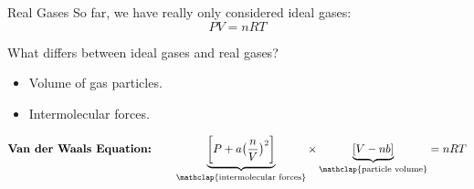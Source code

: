 \documentclass[notes=hide]{beamer}
\begin{document}
\begin{frame}{Real Gases}
	So far, we have really only considered \alert{ideal} gases:
	\begin{equation*}
		PV = nRT
	\end{equation*}

	\pause

	What differs between ideal gases and real gases?
	\begin{itemize}[<+(1)->]
		\item Volume of gas particles.
		\item Intermolecular forces.
	\end{itemize}

	\pause

	\begin{equation*}
		\textbf{Van der Waals Equation:} \qquad \underbrace{\bigg[P +
		a\big(\frac{n}{V}\big)^2\bigg]}_{\mathclap{\text{intermolecular
		forces}}} \times \underbrace{[V-nb]}_{\mathclap{\text{particle
		volume}}} = nRT
	\end{equation*}
\end{frame}
\end{document}
